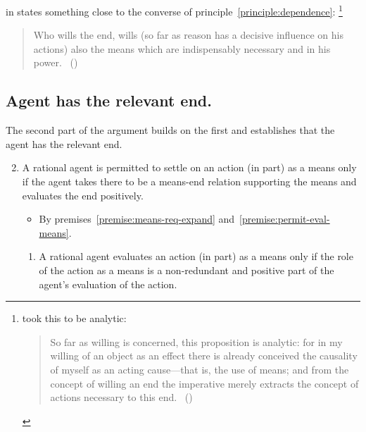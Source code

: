 \documentclass[10pt]{article}
\newcommand{\hozlinedash}[0]{%
  \noindent\hdashrule[0.5ex][c]{\textwidth}{.1pt}{2.5pt}
}
\begin{document}
\hozlinedash

\citeauthor{Kant:1948aa} in  states something close to the converse of principle~\ref{principle:dependence}:\nolinebreak
\footnote{\citeauthor{Kant:1948aa} took this to be analytic:
  \begin{quote}
    So far as willing is concerned, this proposition is analytic: for in my willing of an object as an effect there is already conceived the causality of myself as an acting cause---that is, the use of means; and from the concept of willing an end the imperative merely extracts the concept of actions necessary to this end.\nolinebreak
    \mbox{ }\hfill(\citeyear[81]{Kant:1948aa})
  \end{quote}
}

\begin{quote}
  Who wills the end, wills (so far as reason has a decisive influence on his actions) also the means which are indispensably necessary and in his power.\nolinebreak
  \mbox{ }\hfill\mbox{(\citeyear[80--81/Ak 417]{Kant:1948aa})}
\end{quote}

\hozlinedash


\newpage


\subsection{Agent has the relevant end.}
\label{sec:posessed-end}

The second part of the argument builds on the first and establishes that the agent has the relevant end.

\begin{enumerate}[label=P\arabic*., ref=(P\arabic*)]
  \setcounter{enumi}{1}
\item A rational agent is permitted to settle on an action (in part) as a means only if the agent takes there to be a means-end relation supporting the means and evaluates the end positively.
  \begin{itemize}
  \item By premises~\ref{premise:means-req-expand} and~\ref{premise:permit-eval-means}.
  \end{itemize}
  \begin{enumerate}[label=P\arabic{enumi}\alph*., ref=(P\arabic{enumi}\alph*)]
  \item\label{premise:means-req-expand} A rational agent evaluates an action (in part) as a means only if the role of the action as a means is a non-redundant and positive part of the agent’s evaluation of the action.
  \end{enumerate}
\end{enumerate}
\end{document}
